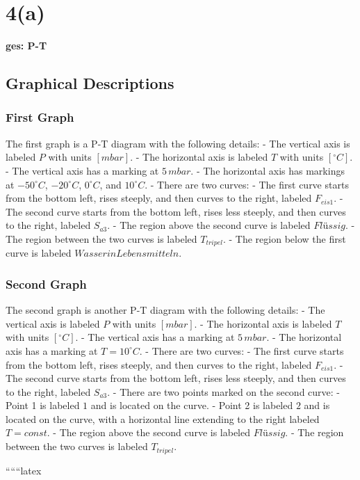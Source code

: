 \section*{4(a)}
\textbf{ges: P-T}

\subsection*{Graphical Descriptions}

\subsubsection*{First Graph}
The first graph is a P-T diagram with the following details:
- The vertical axis is labeled \( P \) with units \([mbar]\).
- The horizontal axis is labeled \( T \) with units \([^\circ C]\).
- The vertical axis has a marking at \( 5 \, mbar \).
- The horizontal axis has markings at \( -50^\circ C \), \( -20^\circ C \), \( 0^\circ C \), and \( 10^\circ C \).
- There are two curves:
  - The first curve starts from the bottom left, rises steeply, and then curves to the right, labeled \( F_{eis1} \).
  - The second curve starts from the bottom left, rises less steeply, and then curves to the right, labeled \( S_{a3} \).
- The region above the second curve is labeled \( Flüssig \).
- The region between the two curves is labeled \( T_{tripel} \).
- The region below the first curve is labeled \( Wasser in Lebensmitteln \).

\subsubsection*{Second Graph}
The second graph is another P-T diagram with the following details:
- The vertical axis is labeled \( P \) with units \([mbar]\).
- The horizontal axis is labeled \( T \) with units \([^\circ C]\).
- The vertical axis has a marking at \( 5 \, mbar \).
- The horizontal axis has a marking at \( T = 10^\circ C \).
- There are two curves:
  - The first curve starts from the bottom left, rises steeply, and then curves to the right, labeled \( F_{eis1} \).
  - The second curve starts from the bottom left, rises less steeply, and then curves to the right, labeled \( S_{a3} \).
- There are two points marked on the second curve:
  - Point 1 is labeled \( 1 \) and is located on the curve.
  - Point 2 is labeled \( 2 \) and is located on the curve, with a horizontal line extending to the right labeled \( T = const \).
- The region above the second curve is labeled \( Flüssig \).
- The region between the two curves is labeled \( T_{tripel} \).

``````latex
